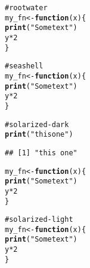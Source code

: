 \documentclass[12pt]{article}\usepackage{graphicx, color}
\makeatletter
\newcommand{\hlfunctioncall}[1]{\textcolor[rgb]{0.188235294117647,0.650980392156863,0.188235294117647}{\textbf{#1}}}%
\newcommand{\hlstring}[1]{\textcolor[rgb]{0.850980392156863,1,0.466666666666667}{#1}}%
\newcommand{\hlcomment}[1]{\textcolor[rgb]{0.533333333333333,0.533333333333333,0.533333333333333}{#1}}%
\newenvironment{kframe}{%
 \def\at@end@of@kframe{}%
 \ifinner\ifhmode%
  \def\at@end@of@kframe{\end{minipage}}%
  \begin{minipage}{\columnwidth}%
 \fi\fi%
 \def\FrameCommand##1{\hskip\@totalleftmargin \hskip-\fboxsep
 \colorbox{shadecolor}{##1}\hskip-\fboxsep
     \hskip-\linewidth \hskip-\@totalleftmargin \hskip\columnwidth}%
 \MakeFramed {\advance\hsize-\width
   \@totalleftmargin\z@ \linewidth\hsize
   \@setminipage}}%
 {\par\unskip\endMakeFramed%
 \at@end@of@kframe}
\newenvironment{knitrout}{}{} %
\makeatother
\begin{document}
\begin{knitrout}
\color{fgcolor}\begin{kframe}
\begin{alltt}
\hlcomment{# rootwater}
my_fn <- \hlfunctioncall{function}(x) \{
    \hlfunctioncall{print}(\hlstring{"Some text"})
    y * 2
\}
\end{alltt}
\end{kframe}
\end{knitrout}





\begin{knitrout}
\color{fgcolor}\begin{kframe}
\begin{alltt}
\hlcomment{# seashell}
my_fn <- \hlfunctioncall{function}(x) \{
    \hlfunctioncall{print}(\hlstring{"Some text"})
    y * 2
\}
\end{alltt}
\end{kframe}
\end{knitrout}





\begin{knitrout}
\color{fgcolor}\begin{kframe}
\begin{alltt}
\hlcomment{# solarized-dark}
\hlfunctioncall{print}(\hlstring{"this one"})
\end{alltt}
\begin{verbatim}
## [1] "this one"
\end{verbatim}
\begin{alltt}
my_fn <- \hlfunctioncall{function}(x) \{
    \hlfunctioncall{print}(\hlstring{"Some text"})
    y * 2
\}
\end{alltt}
\end{kframe}
\end{knitrout}





\begin{knitrout}
\color{fgcolor}\begin{kframe}
\begin{alltt}
\hlcomment{# solarized-light}
my_fn <- \hlfunctioncall{function}(x) \{
    \hlfunctioncall{print}(\hlstring{"Some text"})
    y * 2
\}
\end{alltt}
\end{kframe}
\end{knitrout}
\end{document}
